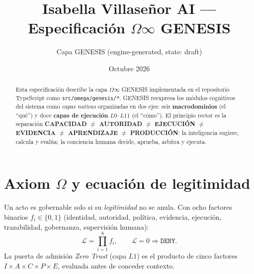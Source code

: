 \documentclass[11pt,a4paper]{article}
\title{\bfseries Isabella Villaseñor AI --- Especificación \(\Omega\infty\) GENESIS}
\author{Capa GENESIS (engine-generated, state: draft)}
\date{Octubre 2026}
\begin{document}
\maketitle

\begin{abstract}
Esta especificación describe la capa \(\Omega\infty\) GENESIS implementada en el repositorio
TypeScript como \texttt{src/omega/genesis/*}. GENESIS reexpresa los módulos cognitivos del
sistema como \emph{capas nativas} organizadas en dos ejes: seis \textbf{macrodominios} (el
``qué'') y doce \textbf{capas de ejecución} \(L0\)--\(L11\) (el ``cómo''). El principio
rector es la separación \textbf{CAPACIDAD \(\neq\) AUTORIDAD \(\neq\) EJECUCIÓN \(\neq\)
EVIDENCIA \(\neq\) APRENDIZAJE \(\neq\) PRODUCCIÓN}: la inteligencia sugiere, calcula y
evalúa; la conciencia humana decide, aprueba, arbitra y ejecuta.
\end{abstract}

\section{Axiom \(\Omega\) y ecuación de legitimidad}
Un acto es gobernable solo si su \emph{legitimidad} no se anula. Con ocho factores binarios
\(f_i \in \{0,1\}\) (identidad, autoridad, política, evidencia, ejecución, trazabilidad,
gobernanza, supervisión humana):
\[
  \mathcal{L} = \prod_{i=1}^{8} f_i, \qquad \mathcal{L}=0 \Rightarrow \texttt{DENY}.
\]
La puerta de admisión \emph{Zero Trust} (capa \(L1\)) es el producto de cinco factores
\(I \times A \times C \times P \times E\), evaluada antes de conceder contexto.
\end{document}
